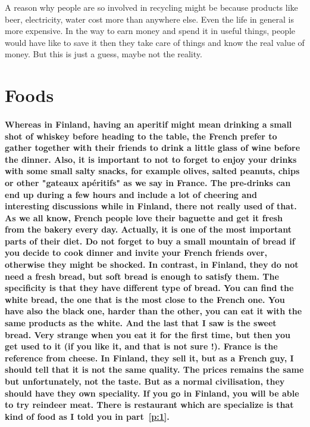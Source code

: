 \documentclass[a4paper,12pt]{report} %
\begin{document}
{A reason why people are so involved in recycling might be because products like beer, electricity, water cost more than anywhere else. Even the life in general is more expensive. In the way to earn money and spend it in useful things, people would have like to save it then they take care of things and know the real value of money. But this is just a guess, maybe not the reality.\newline}

\section{Foods}
\paragraph{Whereas in Finland, having an aperitif might mean drinking a small shot of whiskey before heading to the table, the French prefer to gather together with their friends to drink a little glass of wine before the dinner. Also, it is important to not to forget to enjoy your drinks with some small salty snacks, for example olives, salted peanuts, chips or other "gateaux apéritifs" as we say in France. The pre-drinks can end up during a few hours and include a lot of cheering and interesting discussions while in Finland, there not really used of that.\newline
As we all know, French people love their baguette and get it fresh from the bakery every day. Actually, it is one of the most important parts of their diet. Do not forget to buy a small mountain of bread if you decide to cook dinner and invite your French friends over, otherwise they might be shocked. In contrast, in Finland, they do not need a fresh bread, but soft bread is enough to satisfy them. The specificity is that they have different type of bread. You can find the white bread, the one that is the most close to the French one. You have also the black one, harder than the other, you can eat it with the same products as the white. And the last that I saw is the sweet bread. Very strange when you eat it for the first time, but then you get used to it (if you like it, and that is not sure !).\newline
France is the reference from cheese. In Finland, they sell it, but as a French guy, I should tell that it is not the same quality. The prices remains the same but unfortunately, not the taste. \newline
But as a normal civilisation, they should have they own speciality. If you go in Finland, you will be able to try reindeer meat. There is restaurant which are specialize is that kind of food as I told you in part~\ref{p:1}. \newline
}
\end{document}
